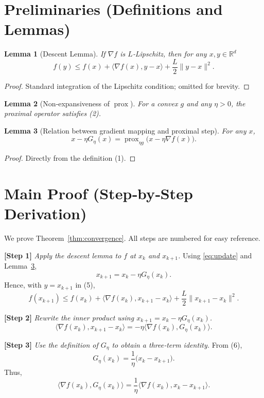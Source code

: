 \documentclass{article}
\newtheorem{lemma}{Lemma}
\newcommand{\prox}{\operatorname{prox}}
\newcommand{\grad}{\nabla}
\newcommand{\R}{\mathbb{R}}
\begin{document}
\newpage
\section*{Preliminaries (Definitions and Lemmas)}
\begin{lemma}[Descent Lemma]\label{lem:descent}
If $\grad f$ is $L$‑Lipschitz, then for any $x,y\in\R^{d}$
\[
f(y)\le f(x)+\langle\grad f(x),y-x\rangle+\frac{L}{2}\|y-x\|^{2}.
\tag{5}
\]
\end{lemma}
\begin{proof}
Standard integration of the Lipschitz condition; omitted for brevity. \qedhere
\end{proof}
\begin{lemma}[Non‑expansiveness of $\prox$]\label{lem:nonexp}
For a convex $g$ and any $\eta>0$, the proximal operator satisfies (2). \qedhere
\end{lemma}
\begin{lemma}[Relation between gradient mapping and proximal step]\label{lem:gradmap}
For any $x$,
\[
x-\eta G_{\eta}(x)=\prox_{\eta g}\!\bigl(x-\eta\grad f(x)\bigr).
\tag{6}
\]
\end{lemma}
\begin{proof}
Directly from the definition (1). \qedhere
\end{proof}

\section*{Main Proof (Step‑by‑Step Derivation)}
We prove Theorem~\ref{thm:convergence}.  
All steps are numbered for easy reference.

\bigskip
\noindent\textbf{[Step 1]} \emph{Apply the descent lemma to $f$ at $x_{k}$ and $x_{k+1}$.}  
Using \eqref{eq:update} and Lemma~\ref{lem:gradmap},
\[
x_{k+1}=x_{k}-\eta G_{\eta}(x_{k}).
\]
Hence, with $y=x_{k+1}$ in (5),
\[
f(x_{k+1})\le f(x_{k})+\langle\grad f(x_{k}),x_{k+1}-x_{k}\rangle+\frac{L}{2}\|x_{k+1}-x_{k}\|^{2}.
\tag{7}
\]

\noindent\textbf{[Step 2]} \emph{Rewrite the inner product using $x_{k+1}=x_{k}-\eta G_{\eta}(x_{k})$.}
\[
\langle\grad f(x_{k}),x_{k+1}-x_{k}\rangle
= -\eta\langle\grad f(x_{k}),G_{\eta}(x_{k})\rangle .
\tag{8}
\]

\noindent\textbf{[Step 3]} \emph{Use the definition of $G_{\eta}$ to obtain a three‑term identity.}  
From (6),
\[
G_{\eta}(x_{k})=\frac{1}{\eta}\bigl(x_{k}-x_{k+1}\bigr).
\]
Thus,
\[
\langle\grad f(x_{k}),G_{\eta}(x_{k})\rangle
= \frac{1}{\eta}\langle\grad f(x_{k}),x_{k}-x_{k+1}\rangle .
\tag{9}
\]
\end{document}
